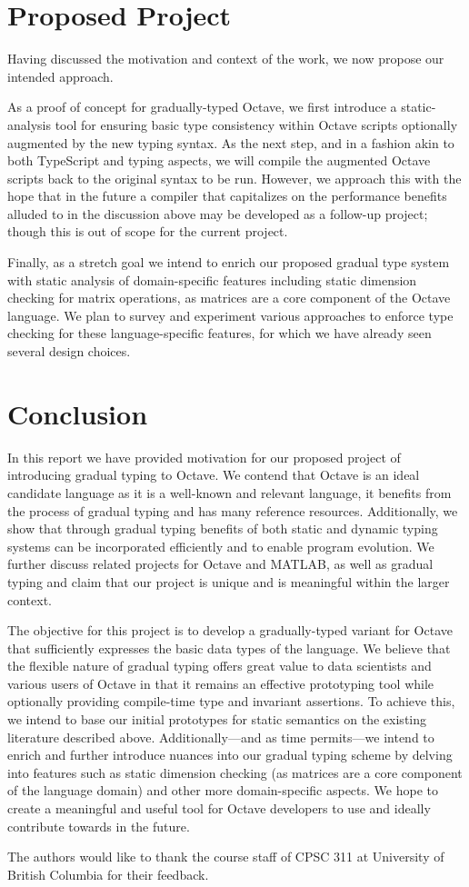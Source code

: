 \section{Proposed Project}
Having discussed the motivation and context of the work, we now propose our intended approach.

As a proof of concept for gradually-typed Octave, we first introduce a static-analysis tool for ensuring basic type consistency within Octave scripts optionally augmented by the new typing syntax. As the next step, and in a fashion akin to both TypeScript and typing aspects, we will compile the augmented Octave scripts back to the original syntax to be run. However, we approach this with the hope that in the future a compiler that capitalizes on the performance benefits alluded to in the discussion above may be developed as a follow-up project; though this is out of scope for the current project.

Finally, as a stretch goal we intend to enrich our proposed gradual type system with static analysis of domain-specific features including static dimension checking for matrix operations, as matrices are a core component of the Octave language. We plan to survey and experiment various approaches to enforce type checking for these language-specific features, for which we have already seen several design choices.

\section{Conclusion}
In this report we have provided motivation for our proposed project of introducing gradual typing to Octave. We contend that Octave is an ideal candidate language as it is a well-known and relevant language, it benefits from the process of gradual typing and has many reference resources. Additionally, we show that through gradual typing benefits of both static and dynamic typing systems can be incorporated efficiently and to enable program evolution. We further discuss related projects for Octave and MATLAB, as well as gradual typing and claim that our project is unique and is meaningful within the larger context.
 
The objective for this project is to develop a gradually-typed variant for Octave that sufficiently expresses the basic data types of the language. We believe that the flexible nature of gradual typing offers great value to data scientists and various users of Octave in that it remains an effective prototyping tool while optionally providing compile-time type and invariant assertions. To achieve this, we intend to base our initial prototypes for static semantics on the existing literature described above. Additionally---and as time permits---we intend to enrich and further introduce nuances into our gradual typing scheme by delving into features such as static dimension checking (as matrices are a core component of the language domain) and other more domain-specific aspects. We hope to create a meaningful and useful tool for Octave developers to use and ideally contribute towards in the future.


\appendix

\begin{acks}
    The authors would like to thank the course staff of CPSC 311 at University
    of British Columbia for their feedback.
\end{acks}
